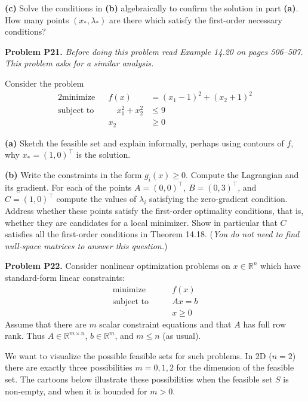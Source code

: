 \documentclass[12pt]{amsart}
\newcommand{\RR}{\mathbb{R}}
\newcommand{\prob}[1]{\bigskip\noindent\textbf{#1}\quad }
\newcommand{\epart}[1]{\medskip\noindent\textbf{(#1)}\quad }
\begin{document}
\epart{c}  Solve the conditions in \textbf{(b)} algebraically to confirm the solution in part \textbf{(a)}.  How many points $(x_*,\lambda_*)$ are there which satisfy the first-order necessary conditions?


\prob{Problem P21.}  \emph{Before doing this problem read Example 14.20 on pages 506--507.  This problem asks for a similar analysis.}

\medskip \noindent Consider the problem
\begin{alignat*}{2}
    \text{minimize}   &&  f(x) &= (x_1-1)^2 + (x_2+1)^2 \\
    \text{subject to} && \quad x_1^2 + x_2^2 &\le 9 \\
                      &&        x_2 &\ge 0
\end{alignat*}

\epart{a}  Sketch the feasible set and explain informally, perhaps using contours of $f$, why $x_*=(1,0)^\top$ is the solution.

\epart{b}  Write the constraints in the form $g_i(x)\ge 0$.  Compute the Lagrangian and its gradient.  For each of the points $A = (0,0)^\top$, $B=(0,3)^\top$, and $C=(1,0)^\top$ compute the values of $\lambda_i$ satisfying the zero-gradient condition.  Address whether these points satisfy the first-order optimality conditions, that is, whether they are candidates for a local minimizer.  Show in particular that $C$ satisfies all the first-order conditions in Theorem 14.18.  (\emph{You do \emph{not} need to find null-space matrices to answer this question.})


\prob{Problem P22.}  Consider nonlinear optimization problems on $x\in \RR^n$ which have standard-form linear constraints:
    $$\begin{matrix}
    \text{minimize} \qquad & f(x) \\
    \text{subject to} \qquad & Ax = b \\
                      & x \ge 0
    \end{matrix}$$
Assume that there are $m$ scalar constraint equations and that $A$ has full row rank.  Thus $A\in \RR^{m\times n}$, $b\in \RR^m$, and $m\le n$ (as usual).

\medskip \noindent We want to visualize the possible feasible sets for such problems.  In 2D ($n=2$) there are exactly three possibilities $m=0,1,2$ for the dimension of the feasible set.  The cartoons below illustrate these possibilities when the feasible set $S$ is non-empty, and when it is bounded for $m>0$.
\end{document}
